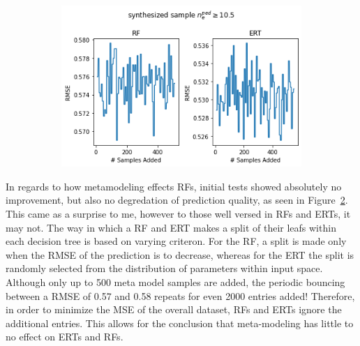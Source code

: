 \documentclass[a4paper, twoside, final, 12pt]{article}
\begin{document}
{\begin{figure}
\begin{subfigure}{0.33\linewidth}
		\caption{}
		\label{subfig:RF_UQ2}
	\end{subfigure}\hfill
	\begin{subfigure}{0.3\linewidth}
		\includegraphics[scale=0.35]{./src/ERT_vs_RF_meta_modeling}
		\caption{}
		\label{subfig:RF_meta_model}
	\end{subfigure}
	\caption{}
	\label{fig:RF_Preds}
\end{figure}

In regards to how metamodeling effects RFs, initial tests showed absolutely no improvement, but also no degredation of prediction quality, as seen in Figure~\ref{subfig:RF_meta_model}.
This came as a surprise to me, however to those well versed in RFs and ERTs, it may not. 
The way in which a RF and ERT makes a split of their leafs within each decision tree is based on varying criteron. 
For the RF, a split is made only when the RMSE of the prediction is to decrease, whereas for the ERT the split is randomly selected from the distribution of parameters within input space.
Although only up to 500 meta model samples are added, the periodic bouncing between a RMSE of 0.57 and 0.58 repeats for even 2000 entries added!
Therefore, in order to minimize the MSE of the overall dataset, RFs and ERTs ignore the additional entries.
This allows for the conclusion that meta-modeling has little to no effect on ERTs and RFs.


}
\end{document}
